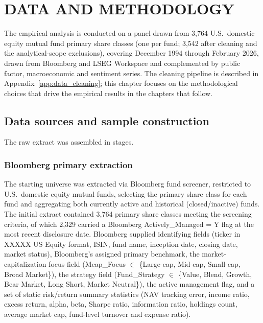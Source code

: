 \documentclass[12pt, oneside]{report}
\begin{document}
\chapter{DATA AND METHODOLOGY}
\label{ch:data}

\noindent The empirical analysis is conducted on a panel drawn from 3{,}764
U.S.\ domestic equity mutual fund primary share classes (one per fund;
3{,}542 after cleaning and the analytical-scope exclusions), covering
December 1994 through February 2026, drawn from Bloomberg and LSEG
Workspace and complemented by public factor, macroeconomic and sentiment
series. The cleaning pipeline is described in
Appendix~\ref{app:data_cleaning}; this chapter focuses on the
methodological choices that drive the empirical results in the chapters
that follow.

\section{Data sources and sample construction}
\label{sec:data_sources}

\noindent The raw extract was assembled in stages.

\subsection{Bloomberg primary extraction}
\label{sec:bloomberg_extract}

\noindent The starting universe was extracted via Bloomberg fund screener, restricted to U.S.\ domestic equity mutual
funds, selecting the primary share class for each fund and aggregating
both currently active and historical (closed/inactive) funds. The initial
extract contained 3{,}764 primary share classes meeting the screening
criteria, of which 2{,}329 carried a Bloomberg Actively\_Managed = Y flag
at the most recent disclosure date. Bloomberg supplied identifying
fields (ticker in XXXXX US Equity format, ISIN, fund name,
inception date, closing date, market status), Bloomberg's assigned primary benchmark,
the market-capitalization focus field
(Mcap\_Focus $\in$ \{Large-cap, Mid-cap, Small-cap, Broad
Market\}), the strategy field (Fund\_Strategy $\in$ \{Value,
Blend, Growth, Bear Market, Long Short, Market Neutral\}), the active
management flag, and a set of static risk/return summary statistics (NAV
tracking error, income ratio, excess return, alpha, beta, Sharpe ratio, information
ratio, holdings count, average market cap, fund-level turnover and
expense ratio).
\end{document}
